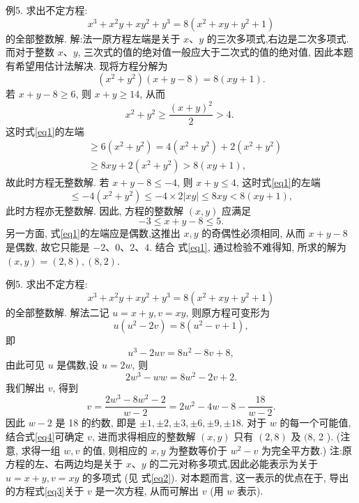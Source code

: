 例5. 求出不定方程:
$$
x^3+x^2 y+x y^2+y^3=8\left(x^2+x y+y^2+1\right)
$$
的全部整数解.
解:法一原方程左端是关于 $x 、 y$ 的三次多项式,右边是二次多项式.
而对于整数 $x 、 y$, 三次式的值的绝对值一般应大于二次式的值的绝对值, 因此本题有希望用估计法解决.
现将方程分解为
$$
\left(x^2+y^2\right)(x+y-8)=8(x y+1) . \label{eq1}
$$
若 $x+y-8 \geqslant 6$, 则 $x+y \geqslant 14$, 从而
$$
x^2+y^2 \geqslant \frac{(x+y)^2}{2}>4 \text {. }
$$
这时式\ref{eq1}的左端
$$
\begin{aligned}
& \geqslant 6\left(x^2+y^2\right)=4\left(x^2+y^2\right)+2\left(x^2+y^2\right) \\
& \geqslant 8 x y+2\left(x^2+y^2\right)>8(x y+1),
\end{aligned}
$$
故此时方程无整数解.
若 $x+y-8 \leqslant-4$, 则 $x+y \leqslant 4$, 这时式\ref{eq1}的左端
$$
\leqslant-4\left(x^2+y^2\right) \leqslant-4 \times 2|x y| \leqslant 8 x y<8(x y+1),
$$
此时方程亦无整数解.
因此, 方程的整数解 $(x, y)$ 应满足
$$
-3 \leqslant x+y-8 \leqslant 5 .
$$
另一方面, 式\ref{eq1}的左端应是偶数,这推出 $x, y$ 的奇偶性必须相同, 从而 $x+ y-8$ 是偶数, 故它只能是 $-2 、 0 、 2 、 4$. 结合 式\ref{eq1}, 通过检验不难得知, 所求的解为 $(x, y)=(2,8),(8,2)$.



例5. 求出不定方程:
$$
x^3+x^2 y+x y^2+y^3=8\left(x^2+x y+y^2+1\right)
$$
的全部整数解.
解法二记 $u=x+y, v=x y$, 则原方程可变形为
$$
u\left(u^2-2 v\right)=8\left(u^2-v+1\right), \label{eq2}
$$
即
$$
u^3-2 u v=8 u^2-8 v+8,
$$
由此可见 $u$ 是偶数,设 $u=2 w$, 则
$$
2 w^3-w w=8 w^2-2 v+2 . \label{eq3}
$$
我们解出 $v$, 得到
$$
v=\frac{2 w^3-8 w^2-2}{w-2}=2 w^2-4 w-8-\frac{18}{w-2} . \label{eq4}
$$
因此 $w-2$ 是 18 的约数, 即是 $\pm 1, \pm 2, \pm 3, \pm 6, \pm 9, \pm 18$. 对于 $w$ 的每一个可能值, 结合式\ref{eq4}可确定 $v$, 进而求得相应的整数解 $(x, y)$ 只有 $(2,8)$ 及 $(8$, 2 ). (注意, 求得一组 $w, v$ 的值, 则相应的 $x, y$ 为整数等价于 $w^2-v$ 为完全平方数.)
注:原方程的左、右两边均是关于 $x 、 y$ 的二元对称多项式,因此必能表示为关于 $u=x+y, v=x y$ 的多项式 (见 式\ref{eq2}). 对本题而言, 这一表示的优点在于, 导出的方程式\ref{eq3}关于 $v$ 是一次方程, 从而可解出 $v$ (用 $w$ 表示).



